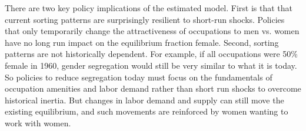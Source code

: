 \documentclass[11pt]{article}
\begin{document}








There are two key policy implications of the estimated model. First is that that current sorting patterns are surprisingly resilient to short-run shocks. Policies that only temporarily change the attractiveness of occupations to men vs. women have no long run impact on the equilibrium fraction female. Second, sorting patterns are not historically dependent. For example, if all occupations were 50\% female in 1960, gender segregation would still be very similar to what it is today. So policies to reduce segregation today must focus on the fundamentals of occupation amenities and labor demand rather than short run shocks to overcome historical inertia. But changes in labor demand and supply can still move the existing equilibrium, and such movements are reinforced by women wanting to work with women.
\end{document}
